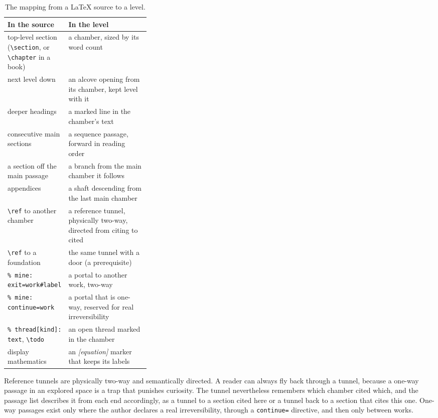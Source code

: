 \documentclass[11pt]{article}
\theoremstyle{remark}
\begin{document}
\begin{table}[htbp]
\centering\small
\begin{tabularx}{\linewidth}{>{\raggedright}p{0.33\linewidth}X}
\toprule
In the source & In the level \\
\midrule
top-level section (\texttt{\textbackslash section}, or \texttt{\textbackslash chapter} in a book) & a chamber, sized by its word count \\
next level down & an alcove opening from its chamber, kept level with it \\
deeper headings & a marked line in the chamber's text \\
consecutive main sections & a sequence passage, forward in reading order \\
a section off the main passage & a branch from the main chamber it follows \\
appendices & a shaft descending from the last main chamber \\
\texttt{\textbackslash ref} to another chamber & a reference tunnel, physically two-way, directed from citing to cited \\
\texttt{\textbackslash ref} to a foundation & the same tunnel with a door (a prerequisite) \\
\texttt{\% mine: exit=work\#label} & a portal to another work, two-way \\
\texttt{\% mine: continue=work} & a portal that is one-way, reserved for real irreversibility \\
\texttt{\% thread[kind]: text}, \texttt{\textbackslash todo} & an open thread marked in the chamber \\
display mathematics & an \emph{[equation]} marker that keeps its labels \\
\bottomrule
\end{tabularx}
\caption{The mapping from a LaTeX source to a level.}
\label{tab:mapping}
\end{table}

Reference tunnels are physically two-way and semantically directed. A reader can always fly back through a tunnel, because a one-way passage in an explored space is a trap that punishes curiosity. The tunnel nevertheless remembers which chamber cited which, and the passage list describes it from each end accordingly, as a tunnel to a section cited here or a tunnel back to a section that cites this one. One-way passages exist only where the author declares a real irreversibility, through a \texttt{continue=} directive, and then only between works.
\end{document}
